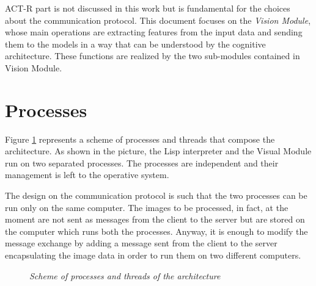 	\mbox{ACT-R} part is not discussed in this work but is fundamental for the choices about the communication protocol.
	This document focuses on the \emph{Vision Module}, whose main operations are extracting features from the input data and sending them to the models in a way that can be understood by the cognitive architecture. 
	These functions are realized by the two sub-modules contained in Vision Module.

	\section{Processes}
	Figure \ref{fig:processes} represents a scheme of processes and threads that compose the architecture.
	As shown in the picture, the \mbox{Lisp} interpreter and the Visual Module run on two separated processes. 
	The processes are independent and their management is left to the operative system.

	The design on the communication protocol is such that the two processes can be run only on the same computer. 
	The images to be processed, in fact, at the moment are not sent as messages from the client to the server but are stored on the computer which runs both the processes.
	Anyway, it is enough to modify the message exchange by adding a message sent from the client to the server encapsulating the image data in order to run them on two different computers.
	
	\begin{figure}[h]
	  \begin{center} 
	  \end{center} 
	  \caption{\textit{Scheme of processes and threads of the architecture}}  
	  \label{fig:processes}
 	\end{figure}

